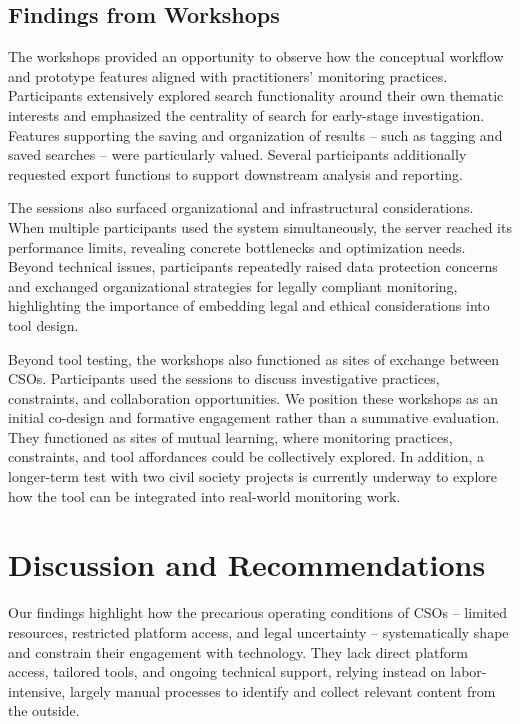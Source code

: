 \documentclass[acmsmall]{acmart}
\begin{document}
\subsection{Findings from Workshops}
The workshops provided an opportunity to observe how the conceptual workflow and prototype features aligned with practitioners' monitoring practices. Participants extensively explored search functionality around their own thematic interests and emphasized the centrality of search for early-stage investigation. Features supporting the saving and organization of results -- such as tagging and saved searches -- were particularly valued. Several participants additionally requested export functions to support downstream analysis and reporting.

The sessions also surfaced organizational and infrastructural considerations. When multiple participants used the system simultaneously, the server reached its performance limits, revealing concrete bottlenecks and optimization needs. Beyond technical issues, participants repeatedly raised data protection concerns and exchanged organizational strategies for legally compliant monitoring, highlighting the importance of embedding legal and ethical considerations into tool design. 

Beyond tool testing, the workshops also functioned as sites of exchange between CSOs. Participants used the sessions to discuss investigative practices, constraints, and collaboration opportunities. 
We position these workshops as an initial co-design and formative engagement rather than a summative evaluation. They functioned as sites of mutual learning, where monitoring practices, constraints, and tool affordances could be collectively explored. In addition, a longer-term test with two civil society projects is currently underway to explore how the tool can be integrated into real-world monitoring work.


\section{Discussion and Recommendations}
Our findings highlight how the precarious operating conditions of CSOs -- limited resources, restricted platform access, and legal uncertainty -- systematically shape and constrain their engagement with technology. They lack direct platform access, tailored tools, and ongoing technical support, relying instead on labor-intensive, largely manual processes to identify and collect relevant content from the outside.
\end{document}
